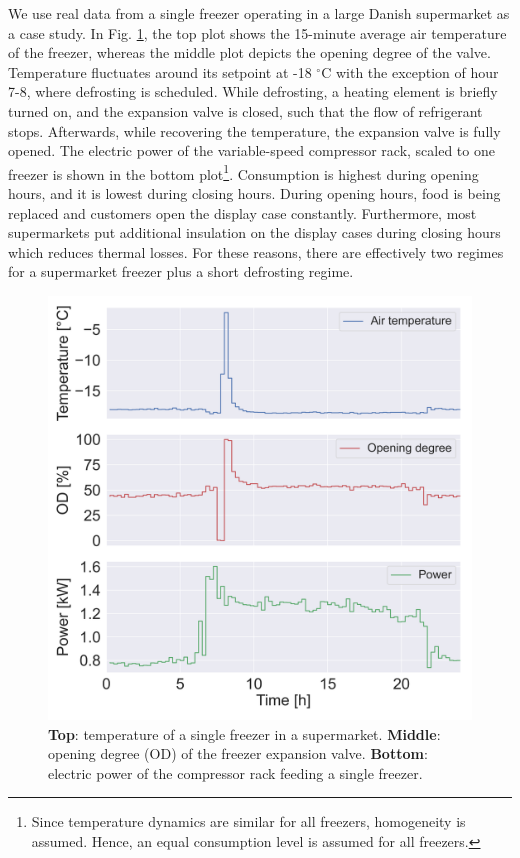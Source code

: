 We use real data from a single freezer operating in a large Danish supermarket as a case study.
In Fig. \ref{fig:chunk}, the top plot shows the 15-minute average air temperature of the freezer, whereas the middle plot depicts the opening degree of the valve.
Temperature fluctuates around its setpoint at -18 $^{\circ}$C with the exception of hour 7-8, where defrosting is scheduled.
While defrosting, a heating element is briefly turned on, and the expansion valve is closed, such that the flow of refrigerant stops. Afterwards, while recovering the temperature, the expansion valve is fully opened.
The electric power of the variable-speed compressor rack, scaled to one freezer is shown in the bottom plot\footnote{Since temperature dynamics are similar for all freezers, homogeneity is assumed. Hence, an equal consumption level is assumed for all freezers.}.
Consumption is highest during opening hours, and it is lowest during closing hours.
During opening hours, food is being replaced and customers open the display case constantly.
Furthermore, most supermarkets put additional insulation on the display cases during closing hours which reduces thermal losses.
For these reasons, there are effectively two regimes for a supermarket freezer plus a short defrosting regime.
\begin{figure}[!t]
    \centering
    \includegraphics[width=\columnwidth]{../figures/tmp_od_Pt.png}
    \caption{\textbf{Top}: temperature of a single freezer in a supermarket. \textbf{Middle}: opening degree (OD) of the freezer expansion valve. \textbf{Bottom}: electric power of the compressor rack feeding a single freezer.}
    \label{fig:chunk}
    \vspace{-1mm}
\end{figure}

